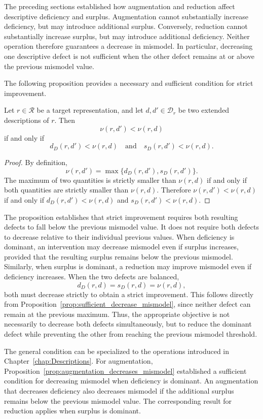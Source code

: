 The preceding sections established how augmentation and reduction affect descriptive deficiency and surplus. Augmentation cannot substantially increase deficiency, but may introduce additional surplus. Conversely, reduction cannot substantially increase surplus, but may introduce additional deficiency. Neither operation therefore guarantees a decrease in mismodel. In particular, decreasing one descriptive defect is not sufficient when the other defect remains at or above the previous mismodel value.

The following proposition provides a necessary and sufficient condition for strict improvement.

\begin{proposition}
\label{prop:sufficient_decrease_mismodel}
Let $r\in\mathcal R$ be a target representation, and let $d,d'\in\mathcal D_r$ be two extended descriptions of $r$. Then
\[
\nu(r,d')<\nu(r,d)
\]
if and only if
\[
d_D(r,d')<\nu(r,d) \quad \text{and} \quad s_D(r,d')<\nu(r,d).
\]
\end{proposition}
\begin{proof}
By definition,
\[
\nu(r,d') = \max\{d_D(r,d'),s_D(r,d')\}.
\]
The maximum of two quantities is strictly smaller than $\nu(r,d)$ if and only if both quantities are strictly smaller than $\nu(r,d)$. Therefore $\nu(r,d')<\nu(r,d)$ if and only if $d_D(r,d')<\nu(r,d)$ and $s_D(r,d')<\nu(r,d)$.
\end{proof}

The proposition establishes that strict improvement requires both resulting defects to fall below the previous mismodel value. It does not require both defects to decrease relative to their individual previous values. When deficiency is dominant, an intervention may decrease mismodel even if surplus increases, provided that the resulting surplus remains below the previous mismodel. Similarly, when surplus is dominant, a reduction may improve mismodel even if deficiency increases. When the two defects are balanced,
\[
d_D(r,d)=s_D(r,d)=\nu(r,d),
\]
both must decrease strictly to obtain a strict improvement. This follows directly from Proposition~\ref{prop:sufficient_decrease_mismodel}, since neither defect can remain at the previous maximum. Thus, the appropriate objective is not necessarily to decrease both defects simultaneously, but to reduce the dominant defect while preventing the other from reaching the previous mismodel threshold.

The general condition can be specialized to the operations introduced in Chapter~\ref{chap:Descriptions}. For augmentation, Proposition~\ref{prop:augmentation_decreases_mismodel} established a sufficient condition for decreasing mismodel when deficiency is dominant. An augmentation that decreases deficiency also decreases mismodel if the additional surplus remains below the previous mismodel value. The corresponding result for reduction applies when surplus is dominant.


